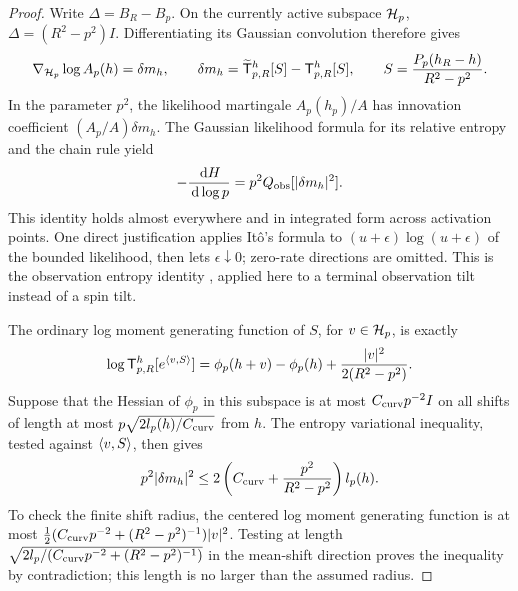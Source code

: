 \begin{proof}
Write \(\Delta=B_R-B_p\).  On the currently active subspace
\(\mathcal H_p\), \(\Delta=(R^2-p^2)I\).  Differentiating its Gaussian
convolution therefore gives
\[
 \nabla_{\mathcal H_p}\log A_p(h)=\delta m_h,\qquad
 \delta m_h=\widetilde{\mathsf T}_{p,R}^h[S]
                    -\mathsf T_{p,R}^h[S],\qquad
 S=\frac{P_p(h_R-h)}{R^2-p^2}.
\]
In the parameter \(p^2\), the likelihood martingale \(A_p(h_p)/A\)
has innovation coefficient \((A_p/A)\delta m_h\).  The Gaussian
likelihood formula for its relative entropy and the chain rule yield
\begin{equation}
 -\frac{\,\mathrm d H}{\,\mathrm d\log p}
      =p^2Q_{\rm obs}[|\delta m_h|^2] .                   \label{warm:bridge-loss}
\end{equation}
This identity holds almost everywhere and in integrated form across
activation points.  One direct justification applies It\^o's formula
to \((u+\epsilon)\log(u+\epsilon)\) of the bounded likelihood,
then lets \(\epsilon\downarrow0\); zero-rate directions are omitted.
This is the observation entropy identity
\cite[Lemma~19.2, Equation~(19.6)]{CM}, applied here to a terminal
observation tilt instead of a spin tilt.

The ordinary log moment generating function of \(S\), for
\(v\in\mathcal H_p\), is exactly
\[
 \log\mathsf T_{p,R}^h[e^{\langle v,S\rangle}]
   =\phi_p(h+v)-\phi_p(h)+\frac{|v|^2}{2(R^2-p^2)} .
\]
Suppose that the Hessian of \(\phi_p\) in this subspace is at most
\(C_{\rm curv}p^{-2}I\) on all shifts of length at most
\(p\sqrt{2l_p(h)/C_{\rm curv}}\) from \(h\).  The entropy variational
inequality, tested against \(\langle v,S\rangle\), then gives
\begin{equation}
 p^2|\delta m_h|^2
 \le2\left(C_{\rm curv}+\frac{p^2}{R^2-p^2}\right)l_p(h).
                                                               \label{warm:bridge-mean}
\end{equation}
To check the finite shift radius, the centered log moment generating
function is at most
\(\frac12(C_{\rm curv}p^{-2}+(R^2-p^2)^{-1})|v|^2\).
Testing at length \(\sqrt{2l_p/(C_{\rm curv}p^{-2}+(R^2-p^2)^{-1})}\)
in the mean-shift direction proves the inequality by contradiction;
this length is no larger than the assumed radius.


\end{proof}
